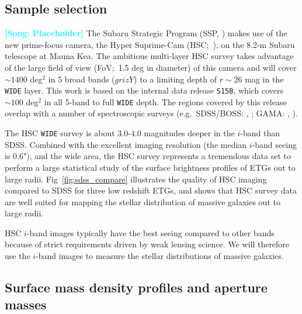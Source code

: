 \documentclass[a4paper,fleqn,usenatbib]{mnras}
\newcommand{\song}[1]{\textcolor{cyan}{\textbf{[Song: #1]}}}
\begin{document}
\subsection{Sample selection}
    \label{ssec:sample}
    
    \song{Placeholder}
    The Subaru Strategic Program (SSP, \citealt{MiyazakiInPrep}) makes use of the new 
    prime-focus camera, the Hyper Suprime-Cam (HSC;~\citealt{Miyazaki2012}), on the 
    8.2-m Subaru telescope at Mauna Kea. 
    The ambitious multi-layer HSC survey takes advantage of the large field of 
    view (FoV;~1.5 deg in diameter) of this camera and will cover $\sim 1400$ deg$^2$ 
    in 5 broad bands ($grizY$) to a limiting depth of $r \sim 26$ mag 
    in the \texttt{WIDE} layer. 
    This work is based on the internal data release \texttt{S15B}, which covers 
    $\sim 100$ deg$^2$ in all 5-band to full \texttt{WIDE} depth.  
    The regions covered by this release overlap with a number of spectroscopic surveys 
    (e.g.\ SDSS/BOSS: \citealt{Eisenstein2011}, \citealt{Alam2015}; 
    GAMA: \citealt{Driver2011}, \citealt{Liske2015}).

    The HSC \texttt{WIDE} survey is about $3.0$-$4.0$ magnitudes deeper in the $i$-band 
    than SDSS. 
    Combined with the excellent imaging resolution (the median $i$-band seeing is 0.6"), 
    and the wide area, the HSC survey represents a tremendous data set to perform a 
    large statistical study of the surface brightness profiles of ETGs out to large radii.     
    Fig~\ref{fig:sdss_compare} illustrates the quality of HSC imaging compared to SDSS 
    for three low redshift ETGs, and shows that HSC survey data are well suited for 
    mapping the stellar distribution of massive galaxies out to large radii.

	HSC $i$-band images typically have the best seeing compared to other bands because 
	of strict requirements driven by weak lensing science. 
    We will therefore use the $i$-band images to measure the stellar distributions of 
    massive galaxies.
     
\subsection{Surface mass density profiles and aperture masses}
    \label{ssec:mass}
    
\end{document}
